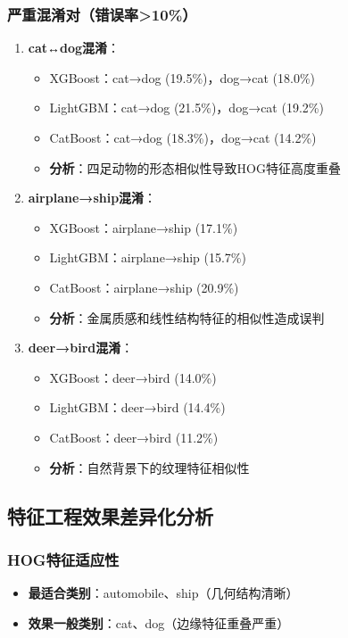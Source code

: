 \documentclass[UTF8]{report}
\theoremstyle{MyLineTheoremStyle} %
\theoremstyle{MyBlockTheoremStyle} %
\theoremstyle{MySubsubsectionStyle} %
\begin{document}
\subsubsection{严重混淆对（错误率>10\%）}
\begin{enumerate}
    \item \textbf{cat↔dog混淆}：
    \begin{itemize}
        \item XGBoost：cat→dog (19.5\%)，dog→cat (18.0\%)
        \item LightGBM：cat→dog (21.5\%)，dog→cat (19.2\%)
        \item CatBoost：cat→dog (18.3\%)，dog→cat (14.2\%)
        \item \textbf{分析}：四足动物的形态相似性导致HOG特征高度重叠
    \end{itemize}
    \item \textbf{airplane→ship混淆}：
    \begin{itemize}
        \item XGBoost：airplane→ship (17.1\%)
        \item LightGBM：airplane→ship (15.7\%)
        \item CatBoost：airplane→ship (20.9\%)
        \item \textbf{分析}：金属质感和线性结构特征的相似性造成误判
    \end{itemize}
    \item \textbf{deer→bird混淆}：
    \begin{itemize}
        \item XGBoost：deer→bird (14.0\%)
        \item LightGBM：deer→bird (14.4\%)
        \item CatBoost：deer→bird (11.2\%)
        \item \textbf{分析}：自然背景下的纹理特征相似性
    \end{itemize}
\end{enumerate}

\subsection{特征工程效果差异化分析}
\subsubsection{HOG特征适应性}
\begin{itemize}
    \item \textbf{最适合类别}：automobile、ship（几何结构清晰）
    \item \textbf{效果一般类别}：cat、dog（边缘特征重叠严重）
\end{itemize}
\end{document}
